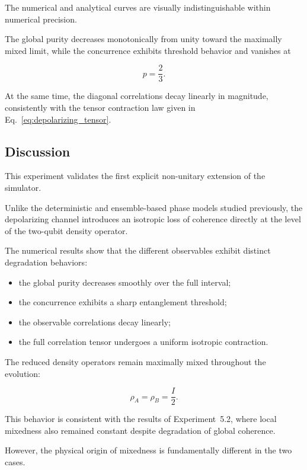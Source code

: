 The numerical and analytical curves are visually indistinguishable within numerical precision.

The global purity decreases monotonically from unity toward the maximally mixed limit, while the concurrence exhibits threshold behavior and vanishes at

\[
p
=
\frac{2}{3}.
\]

At the same time, the diagonal correlations decay linearly in magnitude, consistently with the tensor contraction law given in Eq.~\eqref{eq:depolarizing_tensor}.


\subsection{Discussion}

This experiment validates the first explicit non-unitary extension of the simulator.

Unlike the deterministic and ensemble-based phase models studied previously, the depolarizing channel introduces an isotropic loss of coherence directly at the level of the two-qubit density operator.

The numerical results show that the different observables exhibit distinct degradation behaviors:

\begin{itemize}
    \item the global purity decreases smoothly over the full interval;
    \item the concurrence exhibits a sharp entanglement threshold;
    \item the observable correlations decay linearly;
    \item the full correlation tensor undergoes a uniform isotropic contraction.
\end{itemize}

The reduced density operators remain maximally mixed throughout the evolution:

\[
\rho_A
=
\rho_B
=
\frac{I}{2}.
\]

This behavior is consistent with the results of Experiment~5.2, where local mixedness also remained constant despite degradation of global coherence.

However, the physical origin of mixedness is fundamentally different in the two cases.

